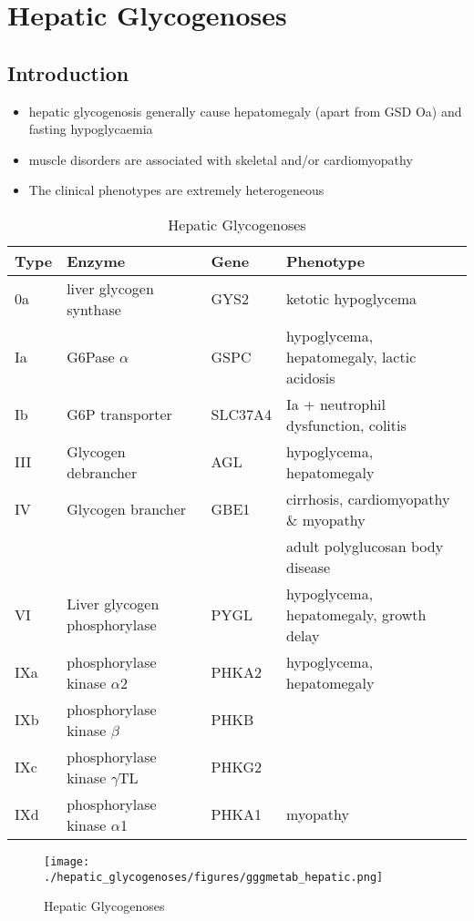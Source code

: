 \documentclass{scrartcl}
\begin{document}
\section{Hepatic Glycogenoses}
\label{sec:orgc56c71b}
\subsection{Introduction}
\label{sec:org6267b79}
\begin{itemize}
\item hepatic glycogenosis generally cause hepatomegaly (apart from GSD
Oa) and fasting hypoglycaemia
\item muscle disorders are associated with skeletal and/or
cardiomyopathy
\item The clinical phenotypes are extremely heterogeneous
\end{itemize}
\begin{table}[htbp]
\caption{\label{tab:org44b7a84}
Hepatic Glycogenoses}
\centering
\begin{tabular}{llll}
Type & Enzyme & Gene & Phenotype\\
\hline
0a & liver glycogen synthase & GYS2 & ketotic hypoglycema\\
Ia & G6Pase \(\alpha\) & GSPC & hypoglycema, hepatomegaly, lactic acidosis\\
Ib & G6P transporter & SLC37A4 & Ia + neutrophil dysfunction, colitis\\
III & Glycogen debrancher & AGL & hypoglycema, hepatomegaly\\
IV & Glycogen brancher & GBE1 & cirrhosis, cardiomyopathy \& myopathy\\
 &  &  & adult polyglucosan body disease\\
VI & Liver glycogen phosphorylase & PYGL & hypoglycema, hepatomegaly, growth delay\\
IXa & phosphorylase kinase \(\alpha\)2 & PHKA2 & hypoglycema, hepatomegaly\\
IXb & phosphorylase kinase \(\beta\) & PHKB & \\
IXc & phosphorylase kinase \(\gamma\)TL & PHKG2 & \\
IXd & phosphorylase kinase \(\alpha\)1 & PHKA1 & myopathy\\
\end{tabular}
\end{table}

\begin{figure}[htbp]
\centering
\texttt{[image: ./hepatic\_glycogenoses/figures/gggmetab\_hepatic.png]}
\caption[Hepatic Glycogenoses]{\label{fig:orgd1b6bf4}
Hepatic Glycogenoses}
\end{figure}
\end{document}
